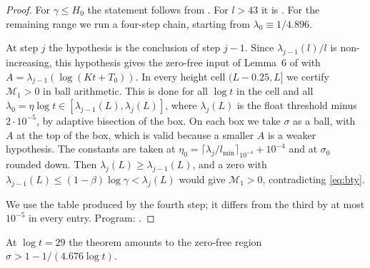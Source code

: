 \begin{proof}
For $\gamma \le H_0$ the statement follows from \cite{PlattTrudgianRH}.
For $l > 43$ it is \cite[Thm.~1]{BTY}.
For the remaining range we run a four-step chain, starting from $\lambda_0 \equiv 1/4.896$.

At step $j$ the hypothesis is the conclusion of step $j-1$.
Since $\lambda_{j-1}(l)/l$ is non-increasing, this hypothesis gives the zero-free input of Lemma~6 of \cite{BTY} with $A = \lambda_{j-1}(\log(Kt+T_0))$.
In every height cell $(L - 0.25, L]$ we certify $\mathcal M_1 > 0$ in ball arithmetic.
This is done for all $\log t$ in the cell and all $\lambda_0 = \eta\log t \in [\lambda_{j-1}(L), \lambda_j(L)]$, where $\lambda_j(L)$ is the float threshold minus $2\cdot10^{-5}$, by adaptive bisection of the box.
On each box we take $\sigma$ as a ball, with $A$ at the top of the box, which is valid because a smaller $A$ is a weaker hypothesis.
The constants are taken at $\eta_0 = \lceil \lambda_j/l_{\min}\rceil_{10^{-4}} + 10^{-4}$ and at $\sigma_0$ rounded down.
Then $\lambda_j(L) \ge \lambda_{j-1}(L)$, and a zero with $\lambda_{j-1}(L) \le (1-\beta)\log\gamma < \lambda_j(L)$ would give $\mathcal M_1 > 0$, contradicting \eqref{eq:bty}.

We use the table produced by the fourth step; it differs from the third by at most $10^{-5}$ in every entry.
Program: .
\end{proof}

At $\log t = 29$ the theorem amounts to the zero-free region $\sigma > 1 - 1/(4.676\log t)$.
